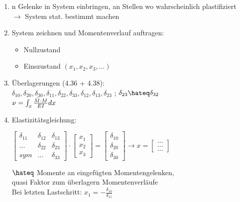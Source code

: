 \documentclass[fleqn,twoside]{article}
\begin{document}
        \begin{enumerate}
            \item n Gelenke in System einbringen, an Stellen wo wahrscheinlich plastifiziert \\ $\rightarrow$ System stat. bestimmt machen
            \item System zeichnen und Momentenverlauf auftragen:
                \begin{itemize}
                    \item Nullzustand
                    \item Einszustand $(x_1, x_2, x_3,\ldots)$
                \end{itemize}
            \item Überlagerungen (4.36 + 4.38): \\
                $\delta_{10}, \delta_{20}, \delta_{30}, \delta_{11}, \delta_{22}, \delta_{33}, \delta_{12}, \delta_{13}, \delta_{23}$ ; $\delta_{23} \hateq \delta_{32}$  \\
                $\nu = \int_x \frac{\Bar{M} \cdot M}{EI} dx$
            \item Elastizitätsgleichung:\\
                \begin{minipage}{0.45\textwidth}
                    $ \begin{bmatrix} \delta_{11} & \delta_{12} & \delta_{13} \\ \ldots & \delta_{22} & \delta_{23} \\ sym & \ldots  & \delta_{33} \end{bmatrix}  
                    \cdot
                    \begin{bmatrix} x_1 \\ x_2 \\ x_3 \end{bmatrix}
                    =
                    \begin{bmatrix} \delta_{10} \\ \delta_{20} \\ \delta_{30} \end{bmatrix}
                    \rightarrow x = \begin{bmatrix} \ldots \\ \ldots \\ \ldots \end{bmatrix}$
                \end{minipage}
                \begin{minipage}{0.55\textwidth}
                    $\hateq$ Momente an eingefügten Momentengelenken, \\ quasi Faktor zum überlagern Momentenverläufe\\
                Bei letzten Lastschritt: $x_1 = - \frac{\delta_{10}}{\delta_{11}}$
                \end{minipage}
                 

\end{enumerate}
\end{document}
